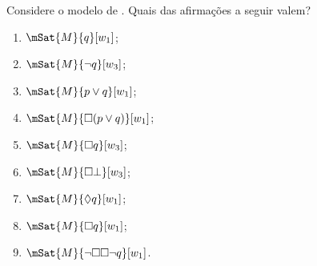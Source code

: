 \documentclass[../../../include/open-logic-section]{subfiles}
\begin{document}
\begin{prob}
  Considere o modelo de . Quais das
  afirmações a seguir valem?
    \begin{enumerate}
    \item $\mSat{M}{q}[w_1]$;
    \item $\mSat{M}{\lnot q}[w_3]$;
    \item $\mSat{M}{p \lor q}[w_1]$;
    \item $\mSat{M}{\Box (p \lor q)}[w_1]$;
    \item $\mSat{M}{\Box q}[w_3]$;
    \item $\mSat{M}{\Box \bot}[w_3]$;
    \item $\mSat{M}{\Diamond q}[w_1]$;
    \item $\mSat{M}{\Box q}[w_1]$;
    \item $\mSat{M}{\lnot \Box\Box \lnot q}[w_1]$.
    \end{enumerate}
\end{prob}
\end{document}
